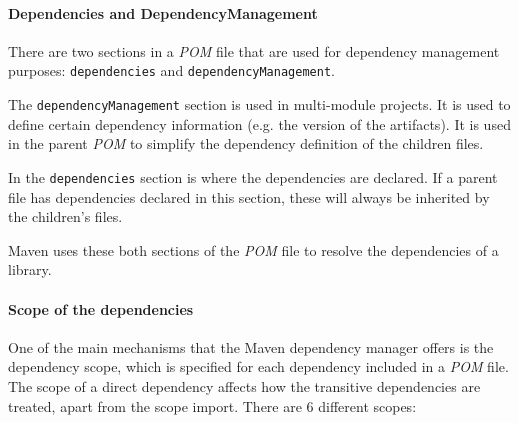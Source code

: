\paragraph{Dependencies and DependencyManagement}
There are two sections in a \textit{POM} file that are used for dependency management purposes: \texttt{dependencies} and \texttt{dependencyManagement}.

The \texttt{dependencyManagement} section is used in multi-module projects. It is used to define certain dependency information (e.g. the version of the artifacts). It is used in the parent \textit{POM} to simplify the dependency definition of the children files.

In the \texttt{dependencies} section is where the dependencies are declared. If a parent file has dependencies declared in this section, these will always be inherited by the children's files.

Maven uses these both sections of the \textit{POM} file to resolve the dependencies of a library.

\paragraph{Scope of the dependencies}
One of the main mechanisms that the Maven dependency manager offers is the dependency scope, which is specified for each dependency included in a \textit{POM} file. The scope of a direct dependency affects how the transitive dependencies are treated, apart from the scope import. There are 6 different scopes:

